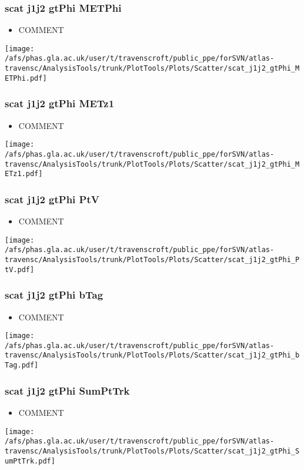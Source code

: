 \documentclass{beamer}
\begin{document}
\begin{frame}
\frametitle{scat j1j2 gtPhi METPhi}
\begin{itemize}
\item COMMENT
\end{itemize}
\begin{center}
\texttt{[image: /afs/phas.gla.ac.uk/user/t/travenscroft/public\_ppe/forSVN/atlas-travensc/AnalysisTools/trunk/PlotTools/Plots/Scatter/scat\_j1j2\_gtPhi\_METPhi.pdf]}
\end{center}
\end{frame}

\begin{frame}
\frametitle{scat j1j2 gtPhi METz1}
\begin{itemize}
\item COMMENT
\end{itemize}
\begin{center}
\texttt{[image: /afs/phas.gla.ac.uk/user/t/travenscroft/public\_ppe/forSVN/atlas-travensc/AnalysisTools/trunk/PlotTools/Plots/Scatter/scat\_j1j2\_gtPhi\_METz1.pdf]}
\end{center}
\end{frame}

\begin{frame}
\frametitle{scat j1j2 gtPhi PtV}
\begin{itemize}
\item COMMENT
\end{itemize}
\begin{center}
\texttt{[image: /afs/phas.gla.ac.uk/user/t/travenscroft/public\_ppe/forSVN/atlas-travensc/AnalysisTools/trunk/PlotTools/Plots/Scatter/scat\_j1j2\_gtPhi\_PtV.pdf]}
\end{center}
\end{frame}

\begin{frame}
\frametitle{scat j1j2 gtPhi bTag}
\begin{itemize}
\item COMMENT
\end{itemize}
\begin{center}
\texttt{[image: /afs/phas.gla.ac.uk/user/t/travenscroft/public\_ppe/forSVN/atlas-travensc/AnalysisTools/trunk/PlotTools/Plots/Scatter/scat\_j1j2\_gtPhi\_bTag.pdf]}
\end{center}
\end{frame}

\begin{frame}
\frametitle{scat j1j2 gtPhi SumPtTrk}
\begin{itemize}
\item COMMENT
\end{itemize}
\begin{center}
\texttt{[image: /afs/phas.gla.ac.uk/user/t/travenscroft/public\_ppe/forSVN/atlas-travensc/AnalysisTools/trunk/PlotTools/Plots/Scatter/scat\_j1j2\_gtPhi\_SumPtTrk.pdf]}
\end{center}
\end{frame}
\end{document}
